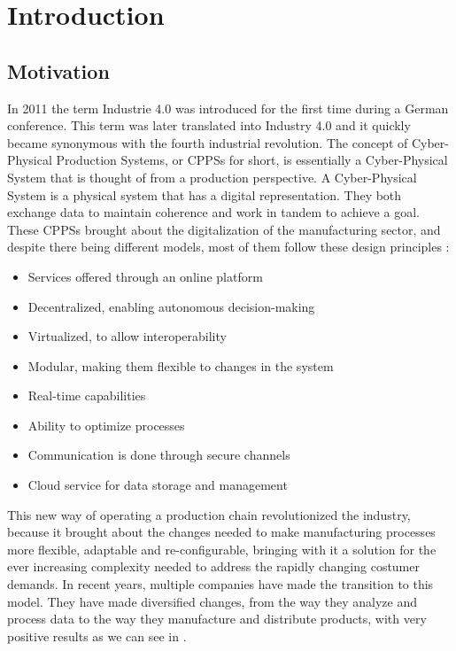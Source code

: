 

\chapter{Introduction}
\label{cha:introduction}

\section{Motivation}
\label{sec:motivation}

In 2011 the term Industrie 4.0 was introduced for the first time during a German conference. This term was later translated into Industry 4.0 and it quickly became synonymous with the fourth industrial revolution. The concept of Cyber-Physical Production Systems, or CPPSs for short, is essentially a Cyber-Physical System that is thought of from a production perspective. A Cyber-Physical System is a physical system that has a digital representation. They both exchange data to maintain coherence and work in tandem to achieve a goal. These CPPSs brought about the digitalization of the manufacturing sector, and despite there being different models, most of them follow these design principles \cite{birgit01}:

\begin{itemize}
	\item Services offered through an online platform
	\item Decentralized, enabling autonomous decision-making
	\item Virtualized, to allow interoperability
	\item Modular, making them flexible to changes in the system
	\item Real-time capabilities
	\item Ability to optimize processes
	\item Communication is done through secure channels
	\item Cloud service for data storage and management
\end{itemize}

This new way of operating a production chain revolutionized the industry, because it brought about the changes needed to make manufacturing processes more flexible, adaptable and re-configurable, bringing with it a solution for the ever increasing complexity needed to address the rapidly changing costumer demands.
In recent years, multiple companies have made the transition to this model. They have made diversified changes, from the way they analyze and process data to the way they manufacture and distribute products, with very positive results as we can see in \cite{rit01}. \\

